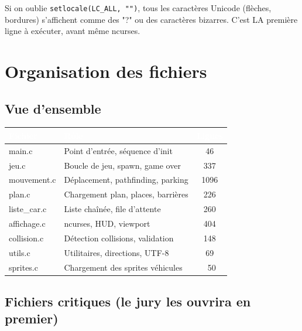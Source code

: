 \documentclass[11pt,a4paper]{article}
\newcommand{\code}[1]{\texttt{\textcolor{accent}{#1}}}
\begin{document}
\begin{warningbox}
Si on oublie \code{setlocale(LC\_ALL, "")}, tous les caractères Unicode (flèches, bordures) s'affichent comme des "?" ou des caractères bizarres. C'est LA première ligne à exécuter, avant même ncurses.
\end{warningbox}

\section{Organisation des fichiers}

\subsection{Vue d'ensemble}

\begin{center}
\begin{tabular}{>{\ttfamily}l l c}
    \toprule
    \rowcolor{primary}
    \textcolor{white}{\textbf{Fichier}} & \textcolor{white}{\textbf{Rôle}} & \textcolor{white}{\textbf{Lignes}} \\
    \midrule
    main.c & Point d'entrée, séquence d'init & 46 \\
    \rowcolor{light}
    jeu.c & Boucle de jeu, spawn, game over & 337 \\
    mouvement.c & Déplacement, pathfinding, parking & 1096 \\
    \rowcolor{light}
    plan.c & Chargement plan, places, barrières & 226 \\
    liste\_car.c & Liste chaînée, file d'attente & 260 \\
    \rowcolor{light}
    affichage.c & ncurses, HUD, viewport & 404 \\
    collision.c & Détection collisions, validation & 148 \\
    \rowcolor{light}
    utils.c & Utilitaires, directions, UTF-8 & 69 \\
    sprites.c & Chargement des sprites véhicules & ~50 \\
    \bottomrule
\end{tabular}
\end{center}

\subsection{Fichiers critiques (le jury les ouvrira en premier)}
\end{document}
